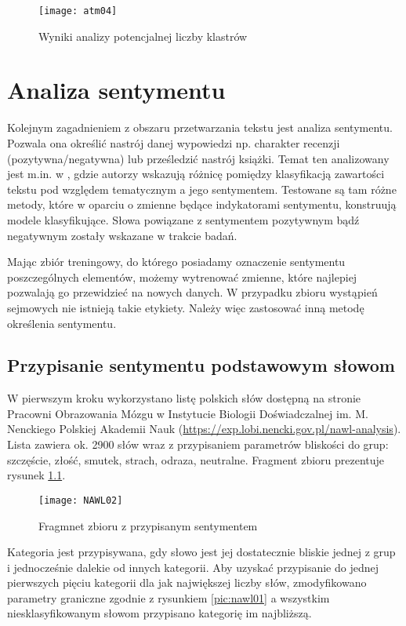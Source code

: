 \documentclass[a4paper,11pt,twoside]{report}
\theoremstyle{definition}
\begin{document}
\begin{figure}[h]
\texttt{[image: atm04]} 
\centering \caption{Wyniki analizy potencjalnej liczby klastrów}
 \label{pic:atm04}
\end{figure}

\chapter{Analiza sentymentu}

Kolejnym zagadnieniem z obszaru przetwarzania tekstu jest analiza sentymentu. Pozwala ona określić nastrój danej wypowiedzi np. charakter recenzji (pozytywna/negatywna) lub prześledzić nastrój książki. Temat ten analizowany jest m.in. w \cite{SA}, gdzie autorzy wskazują różnicę pomiędzy klasyfikacją zawartości tekstu pod względem tematycznym a jego sentymentem. Testowane są tam różne metody, które w oparciu o zmienne będące indykatorami sentymentu, konstruują modele klasyfikujące. Słowa powiązane z sentymentem pozytywnym bądź negatywnym zostały wskazane w trakcie badań.

Mając zbiór treningowy, do którego posiadamy oznaczenie sentymentu poszczególnych elementów, możemy wytrenować zmienne, które najlepiej pozwalają go przewidzieć na nowych danych. W przypadku zbioru wystąpień sejmowych nie istnieją takie etykiety. Należy więc zastosować inną metodę określenia sentymentu. 

\section{Przypisanie sentymentu podstawowym słowom}
W pierwszym kroku wykorzystano listę polskich słów dostępną na stronie Pracowni Obrazowania Mózgu w Instytucie Biologii Doświadczalnej im. M. Nenckiego Polskiej Akademii Nauk (\url{https://exp.lobi.nencki.gov.pl/nawl-analysis}). Lista zawiera ok. 2900 słów wraz z przypisaniem parametrów bliskości do grup: szczęście, złość, smutek, strach, odraza, neutralne. Fragment zbioru prezentuje rysunek \ref{pic:nawl02}. 
\begin{figure}[h]
\texttt{[image: NAWL02]} 
\centering \caption{Fragmnet zbioru z przypisanym sentymentem}
 \label{pic:nawl02}
\end{figure}

Kategoria jest przypisywana, gdy słowo jest jej dostatecznie bliskie jednej z grup i jednocześnie dalekie od innych kategorii. Aby uzyskać przypisanie do jednej pierwszych pięciu kategorii dla jak największej liczby słów, zmodyfikowano parametry graniczne zgodnie z rysunkiem \ref{pic:nawl01} a wszystkim niesklasyfikowanym słowom przypisano kategorię im najbliższą. 
\end{document}
